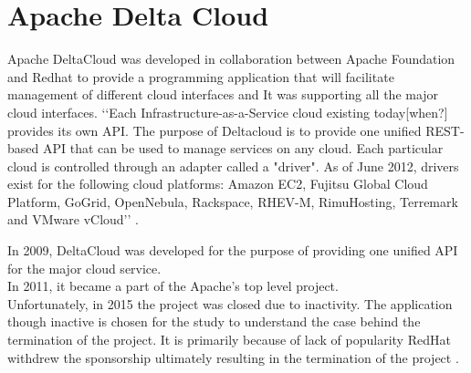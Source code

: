 \section{Apache Delta Cloud}

Apache DeltaCloud was developed in collaboration between Apache Foundation and Redhat
to provide a programming application that will 
facilitate management of different cloud interfaces and
It was supporting all the major cloud interfaces. 
‘‘Each Infrastructure-as-a-Service cloud existing today[when?] provides
its own API. The purpose of Deltacloud is to provide one unified 
REST-based API that can be used to manage services on any cloud. Each particular 
cloud is controlled through an adapter called a "driver". As of June 2012, drivers 
exist for the following cloud platforms: Amazon EC2, Fujitsu Global Cloud Platform, 
GoGrid, OpenNebula, Rackspace, RHEV-M, RimuHosting, Terremark and VMware vCloud’’ 
\cite{hid-sp18-417-wiki-deltacloud}.

In 2009, DeltaCloud was developed for the purpose of providing one unified 
API for the major cloud service. \\
In 2011, it became a part of the Apache’s top level project. \\ Unfortunately,
in 2015 the project was closed due to inactivity. 
The application though inactive is chosen for the study to understand 
the case behind the termination of the project. 
It is primarily because of lack of popularity RedHat withdrew the 
sponsorship ultimately resulting in the 
termination of the project .
